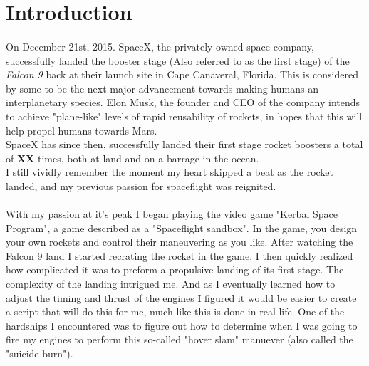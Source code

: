 \documentclass[12pt]{article}
\begin{document}
    \tableofcontents
    \thispagestyle{empty}
    \addtocounter{page}{-1}
    
    
    \newpage
    \section{Introduction} %
    \paragraph{}
        On December 21st, 2015. SpaceX, the privately owned space company, successfully landed the booster stage (Also referred to as the first stage) of the \textit{Falcon 9} back at their launch site in Cape Canaveral, Florida.
        This is considered by some to be the next major advancement towards making humans an interplanetary species. Elon Musk, the founder and CEO of the company 
        intends to achieve "plane-like" levels of rapid reusability of rockets, in hopes that this will help propel humans towards Mars. 
    \\
        SpaceX has since then, successfully landed their first stage rocket boosters a total of \textbf{XX} times, both at land and on a barrage in the ocean. 
    \\ 
        I still vividly remember the moment my heart skipped a beat as the rocket landed, and my previous passion for spaceflight was reignited.
    \paragraph{\noindent}
        With my passion at it's peak I began playing the video game "Kerbal Space Program", a game described as a "Spaceflight sandbox". In the game, you design your own rockets and 
        control their maneuvering as you like. After watching the Falcon 9 land I started recrating the rocket in the game. 
        I then quickly realized how complicated it was to preform a propulsive landing of its first stage. The complexity of the landing intrigued me. 
        And as I eventually learned how to adjust the timing and thrust of the engines I figured it would be easier to create a script that will do this for me, much like this is done in real life.
    \break
        One of the hardships I encountered was to figure out how to determine when I was going to fire my engines to perform this so-called "hover slam" manuever 
        (also called the "suicide burn").
\end{document}
